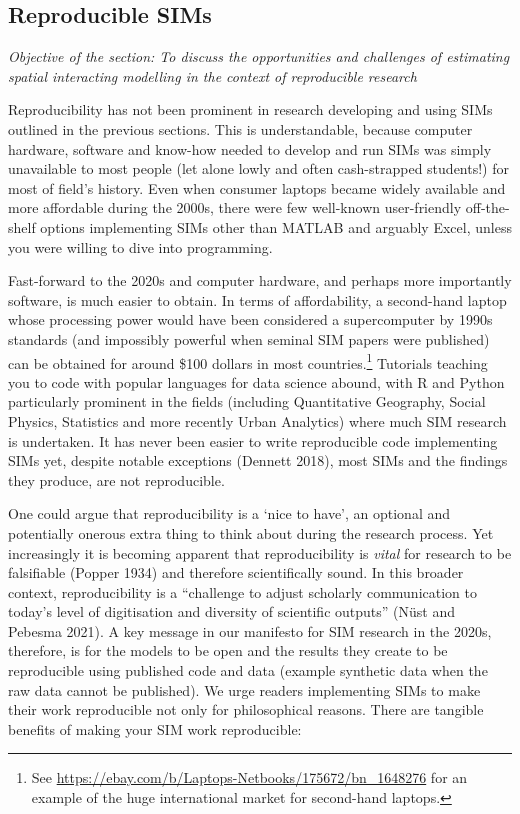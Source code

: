 \documentclass[11pt,letterpaper]{article}
\begin{document}
\hypertarget{reproducible-sims}{%
\subsection{\texorpdfstring{Reproducible SIMs }{Reproducible SIMs }}\label{reproducible-sims}}

\emph{Objective of the section: To discuss the opportunities and challenges of estimating spatial interacting modelling in the context of reproducible research}

Reproducibility has not been prominent in research developing and using SIMs outlined in the previous sections.
This is understandable, because computer hardware, software and know-how needed to develop and run SIMs was simply unavailable to most people (let alone lowly and often cash-strapped students!) for most of field's history.
Even when consumer laptops became widely available and more affordable during the 2000s, there were few well-known user-friendly off-the-shelf options implementing SIMs other than MATLAB and arguably Excel, unless you were willing to dive into programming.

Fast-forward to the 2020s and computer hardware, and perhaps more importantly software, is much easier to obtain.
In terms of affordability, a second-hand laptop whose processing power would have been considered a supercomputer by 1990s standards (and impossibly powerful when seminal SIM papers were published) can be obtained for around \$100 dollars in most countries.\footnote{See \url{https://ebay.com/b/Laptops-Netbooks/175672/bn_1648276} for an example of the huge international market for second-hand laptops.}
Tutorials teaching you to code with popular languages for data science abound, with R and Python particularly prominent in the fields (including Quantitative Geography, Social Physics, Statistics and more recently Urban Analytics) where much SIM research is undertaken.
It has never been easier to write reproducible code implementing SIMs yet, despite notable exceptions (Dennett 2018), most SIMs and the findings they produce, are not reproducible.

One could argue that reproducibility is a `nice to have', an optional and potentially onerous extra thing to think about during the research process.
Yet increasingly it is becoming apparent that reproducibility is \emph{vital} for research to be falsifiable (Popper 1934) and therefore scientifically sound.
In this broader context, reproducibility is a ``challenge to adjust scholarly communication to today's level of digitisation and diversity of scientific outputs'' (Nüst and Pebesma 2021).
A key message in our manifesto for SIM research in the 2020s, therefore, is for the models to be open and the results they create to be reproducible using published code and data (example synthetic data when the raw data cannot be published).
We urge readers implementing SIMs to make their work reproducible not only for philosophical reasons.
There are tangible benefits of making your SIM work reproducible:
\end{document}
